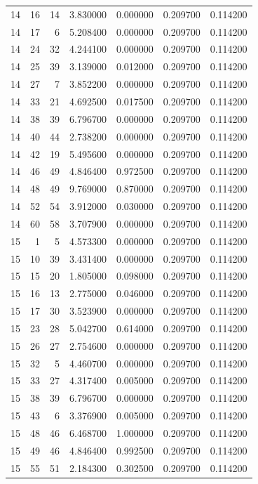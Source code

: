 \begin{table}
\begin{tabular}{rrrrrrr}
14 & 16 & 14 & 3.830000 & 0.000000 & 0.209700 & 0.114200 \\
14 & 17 & 6 & 5.208400 & 0.000000 & 0.209700 & 0.114200 \\
14 & 24 & 32 & 4.244100 & 0.000000 & 0.209700 & 0.114200 \\
14 & 25 & 39 & 3.139000 & 0.012000 & 0.209700 & 0.114200 \\
14 & 27 & 7 & 3.852200 & 0.000000 & 0.209700 & 0.114200 \\
14 & 33 & 21 & 4.692500 & 0.017500 & 0.209700 & 0.114200 \\
14 & 38 & 39 & 6.796700 & 0.000000 & 0.209700 & 0.114200 \\
14 & 40 & 44 & 2.738200 & 0.000000 & 0.209700 & 0.114200 \\
14 & 42 & 19 & 5.495600 & 0.000000 & 0.209700 & 0.114200 \\
14 & 46 & 49 & 4.846400 & 0.972500 & 0.209700 & 0.114200 \\
14 & 48 & 49 & 9.769000 & 0.870000 & 0.209700 & 0.114200 \\
14 & 52 & 54 & 3.912000 & 0.030000 & 0.209700 & 0.114200 \\
14 & 60 & 58 & 3.707900 & 0.000000 & 0.209700 & 0.114200 \\
15 & 1 & 5 & 4.573300 & 0.000000 & 0.209700 & 0.114200 \\
15 & 10 & 39 & 3.431400 & 0.000000 & 0.209700 & 0.114200 \\
15 & 15 & 20 & 1.805000 & 0.098000 & 0.209700 & 0.114200 \\
15 & 16 & 13 & 2.775000 & 0.046000 & 0.209700 & 0.114200 \\
15 & 17 & 30 & 3.523900 & 0.000000 & 0.209700 & 0.114200 \\
15 & 23 & 28 & 5.042700 & 0.614000 & 0.209700 & 0.114200 \\
15 & 26 & 27 & 2.754600 & 0.000000 & 0.209700 & 0.114200 \\
15 & 32 & 5 & 4.460700 & 0.000000 & 0.209700 & 0.114200 \\
15 & 33 & 27 & 4.317400 & 0.005000 & 0.209700 & 0.114200 \\
15 & 38 & 39 & 6.796700 & 0.000000 & 0.209700 & 0.114200 \\
15 & 43 & 6 & 3.376900 & 0.005000 & 0.209700 & 0.114200 \\
15 & 48 & 46 & 6.468700 & 1.000000 & 0.209700 & 0.114200 \\
15 & 49 & 46 & 4.846400 & 0.992500 & 0.209700 & 0.114200 \\
15 & 55 & 51 & 2.184300 & 0.302500 & 0.209700 & 0.114200 \\

\end{tabular}
\end{table}
